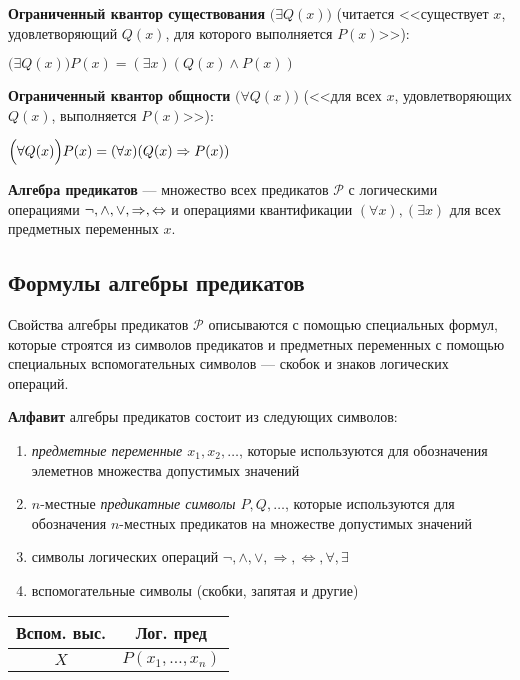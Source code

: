 \dftion \textbf{Ограниченный квантор существования} $\Big(\exists Q(x)\Big)$ (читается <<существует $x$, удовлетворяющий $Q(x)$, для которого выполняется $P(x)$>>):

$\Big(\exists Q(x)\Big)P(x) = (\exists x)(Q(x) \land P(x))$

\dftion \textbf{Ограниченный квантор общности} $\Big(\forall Q(x)\Big)$ (<<для всех $x$, удовлетворяющих $Q(x)$, выполняется $P(x)$>>):

$\Big(\forall Q(x)\Big)P(x) = (\forall x)(Q(x) \Rightarrow P(x))$

\dftion \textbf{Алгебра предикатов} --- множество всех предикатов $\mathscr{P}$ с логическими операциями $\lnot, \land, \lor, \Rightarrow, \Leftrightarrow$ и операциями квантификации $(\forall x), (\exists x)$ для всех предметных переменных $x$.

\subsection{Формулы алгебры предикатов}

Свойства алгебры предикатов $\mathscr{P}$ описываются с помощью специальных формул, которые строятся из символов предикатов и предметных переменных с помощью специальных вспомогательных символов --- скобок и знаков логических операций.

\dftion \textbf{Алфавит} алгебры предикатов состоит из следующих символов:
\begin{enumerate}
    \item {\it предметные переменные $x_1,x_2,\dots$}, которые используются для обозначения элеметнов множества допустимых значений
    \item $n$-местные {\it предикатные символы $P,Q,\dots$}, которые используются для обозначения $n$-местных предикатов на множестве допустимых значений
    \item символы логических операций $\neg, \land, \lor, \Rightarrow, \Leftrightarrow, \forall, \exists$
    \item вспомогательные символы (скобки, запятая и другие)
\end{enumerate}
{\renewcommand{\arraystretch}{1.5}
\setlength{\tabcolsep}{5pt}
    \begin{longtable}[h!]{ |c|c| }
        \hline
        Вспом. выс. & Лог. пред \\
        \hline
        \endhead
        $X$ & $P(x_1, \dots, x_n)$ \\
        \hline
    \end{longtable}}


